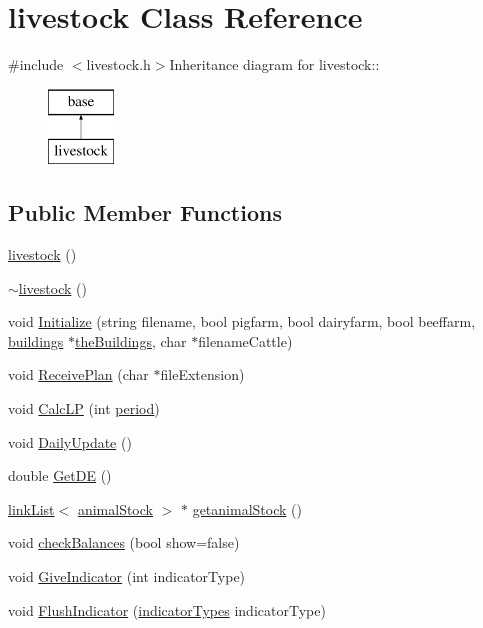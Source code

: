 \hypertarget{classlivestock}{
\section{livestock Class Reference}
\label{classlivestock}
}


{\ttfamily \#include $<$livestock.h$>$}Inheritance diagram for livestock::\begin{figure}[H]
\begin{center}
\leavevmode
\includegraphics[height=2cm]{classlivestock}
\end{center}
\end{figure}
\subsection*{Public Member Functions}
\begin{DoxyCompactItemize}
\item 
\hyperlink{classlivestock_a44943a16d8334d50dba2f804092effcb}{livestock} ()
\item 
\hyperlink{classlivestock_a95bbe104d3e28f65652b6dc49eb959da}{$\sim$livestock} ()
\item 
void \hyperlink{classlivestock_a8c295c86b0d0a7f216289f90da298645}{Initialize} (string filename, bool pigfarm, bool dairyfarm, bool beeffarm, \hyperlink{classbuildings}{buildings} $\ast$\hyperlink{_new_main_8cpp_a8802bc0a0e45fa6db05d71b3e4c39680}{theBuildings}, char $\ast$filenameCattle)
\item 
void \hyperlink{classlivestock_ac94281ef5c9118aad90e6d722130cff5}{ReceivePlan} (char $\ast$fileExtension)
\item 
void \hyperlink{classlivestock_a34799a6605eb906b492063c2ba2c5a2f}{CalcLP} (int \hyperlink{classperiod}{period})
\item 
void \hyperlink{classlivestock_a76b9eb4389d589791cc8fbd6a6551c07}{DailyUpdate} ()
\item 
double \hyperlink{classlivestock_a516359c2727c3410e49f93381eb81655}{GetDE} ()
\item 
\hyperlink{classlink_list}{linkList}$<$ \hyperlink{classanimal_stock}{animalStock} $>$ $\ast$ \hyperlink{classlivestock_a99ae9948a427d2119fbc60ee9a64bf75}{getanimalStock} ()
\item 
void \hyperlink{classlivestock_a943ce10cdce6cdbba61e39bdae6dea8e}{checkBalances} (bool show=false)
\item 
void \hyperlink{classlivestock_aae415bfbff87815b91ae3968a6859f30}{GiveIndicator} (int indicatorType)
\item 
void \hyperlink{classlivestock_a1a71246b0cb2650ea78da26ad87ca4f9}{FlushIndicator} (\hyperlink{typer_8h_af7c21877c7448b813184ececcc1af13c}{indicatorTypes} indicatorType)
\end{DoxyCompactItemize}


